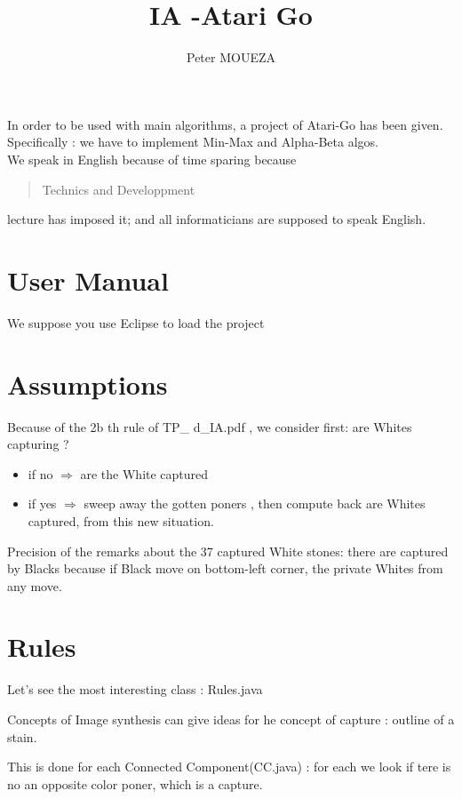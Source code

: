 \documentclass{book}
\newcommand{\tmtextbf}[1]{{\bfseries{#1}}}
\begin{document}
\title{IA -Atari Go}
\author{Peter MOUEZA}
\maketitle


In order to be used with main algorithms, a project of Atari-Go has been given.
Specifically : we have to implement Min-Max  and Alpha-Beta algos.\\
We speak in English because of time sparing because \begin{quotation}
Technics and Developpment
\end{quotation} lecture has imposed it; and all informaticians are supposed to speak English.


\chapter{User Manual}

We suppose you use Eclipse to load the project  
\chapter{Assumptions}
Because of the 2b th rule of 
TP\_
d\_IA.pdf , we consider first: are Whites capturing 
?\\
\begin{itemize}
\item if no 
$
\Rightarrow
$
are the White captured
\item if yes 
$
\Rightarrow
$
sweep away the gotten poners , then compute back are Whites captured, from this new situation.
\end{itemize}

Precision of the remarks about the 37 captured White stones: there are captured by Blacks because if Black move on bottom-left corner, the private Whites from any move.
\chapter{Rules}

Let's see the most interesting class : Rules.java

Concepts of Image synthesis can give ideas for he concept of capture : outline of a stain.

This is done for each Connected Component(CC.java) : for each we look if tere is no an opposite color poner, which is a capture. 
\end{document}
